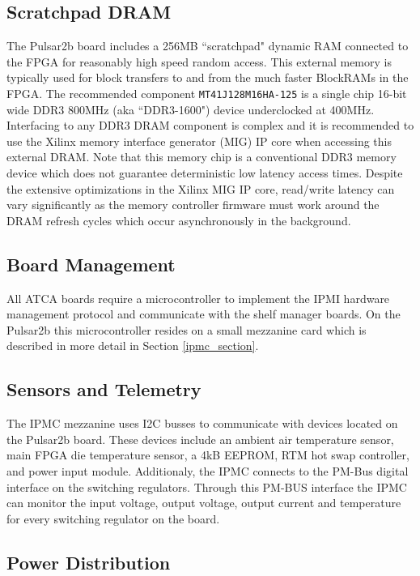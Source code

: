 \documentclass[letterpaper]{article}
\begin{document}
\subsection{Scratchpad DRAM}

The Pulsar2b board includes a 256MB ``scratchpad" dynamic RAM connected to the FPGA for reasonably high speed random access.  This external memory is typically used for block transfers to and from the much faster BlockRAMs in the FPGA.  The recommended component \texttt{MT41J128M16HA-125} is a single chip 16-bit wide DDR3 800MHz (aka ``DDR3-1600") device underclocked at 400MHz.  Interfacing to any DDR3 DRAM component is complex and it is recommended to use the Xilinx memory interface generator (MIG) IP core when accessing this external DRAM.  Note that this memory chip is a conventional DDR3 memory device which does not guarantee deterministic low latency access times.  Despite the extensive optimizations in the Xilinx MIG IP core, read/write latency can vary significantly as the memory controller firmware must work around the DRAM refresh cycles which occur asynchronously in the background.

\subsection{Board Management}

All ATCA boards require a microcontroller to implement the IPMI hardware management protocol and communicate with the shelf manager boards.  On the Pulsar2b this microcontroller resides on a small mezzanine card which is described in more detail in Section \ref{ipmc_section}.

\subsection{Sensors and Telemetry}

The IPMC mezzanine uses I2C busses to communicate with devices located on the Pulsar2b board.  These devices include an ambient air temperature sensor, main FPGA die temperature sensor, a 4kB EEPROM, RTM hot swap controller, and power input module.  Additionaly, the IPMC connects to the PM-Bus digital interface on the switching regulators.  Through this PM-BUS interface the IPMC can monitor the input voltage, output voltage, output current and temperature for every switching regulator on the board.

\subsection{Power Distribution}
\end{document}
